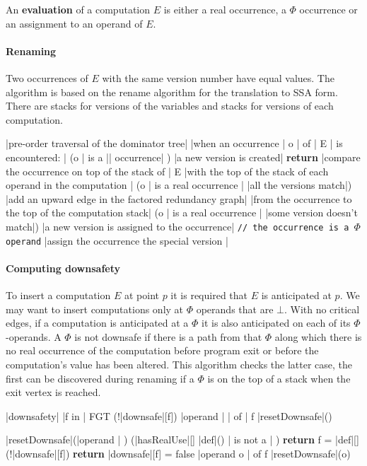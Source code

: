 \documentclass[a4paper,12pt, notitlepage]{article}
\newcommand{\negv}{\vspace{-0.7cm}}
\begin{document}
An \textbf{evaluation} of a computation $E$ is either a real occurrence, a
$\Phi$ occurrence or an assignment to an operand of $E$.

\paragraph*{Renaming}
Two occurrences of $E$ with the same version number have equal values. 
The algorithm is based on the rename algorithm for the translation to SSA form.
There are stacks for versions of the variables and stacks for versions of each
computation.

\negv
\begin{program}
|pre-order traversal of the dominator tree|
|when an occurrence | o | of | E | is encountered: |
\IF (o | is a |\Phi| occurrence| ) \AR*
    |a new version is created|
    \textbf{return}
\FI
|compare the occurrence on top of the stack of | E
|with the top of the stack of each operand in the computation |
\IF (o | is a real occurrence | \land |all the versions match|) \AR*
    |add an upward edge in the factored redundancy graph|
    |from the occurrence to the top of the computation stack|
\ELSIF (o | is a real occurrence | \land |some version doesn't match|) \AR*
    |a new version is assigned to the occurrence|
\ELSE %
    \texttt{// the occurrence is a $\Phi$ operand}
    |assign the occurrence the special version |\bot
\FI
\end{program}

\paragraph*{Computing downsafety}
To insert a computation $E$ at point $p$ it is required that $E$ is anticipated
at $p$. We may want to insert computations only at $\Phi$ operands that are 
$\bot$. With no critical edges, if a computation is anticipated at a $\Phi$ it
is also anticipated on each of its $\Phi$-operands. A $\Phi$ is not downsafe if
there is a path from that $\Phi$ along which there is no real occurrence of the
computation before program exit or before the computation's value has been
altered. This algorithm checks the latter case, the first can be discovered
during renaming if a $\Phi$ is on the top of a stack when the exit vertex is
reached.

\pagebreak
\begin{program}
\PROC |downsafety| \BODY
    \FOREACH |f in | FGT \DO
        \IF (!|downsafe|[f]) \AR*
            \FOREACH |operand | \omega | of | f \DO
                |resetDownsafe|(\omega)
            \OD
        \FI
    \OD
\end{program}
\negv
\begin{program}
\PROC |resetDownsafe|(|operand | \omega) \BODY
    \IF (|hasRealUse|[\omega] \lor |def|(\omega) | is not a | \Phi) \AR*
        \textbf{return}
    \FI
    f = |def|[\omega]
    \IF (!|downsafe|[f]) \AR* \textbf{return} \FI
    |downsafe|[f] = false
    \FOREACH |operand o | of f \DO
        |resetDownsafe|(o)
    \OD
\end{program}
\end{document}
